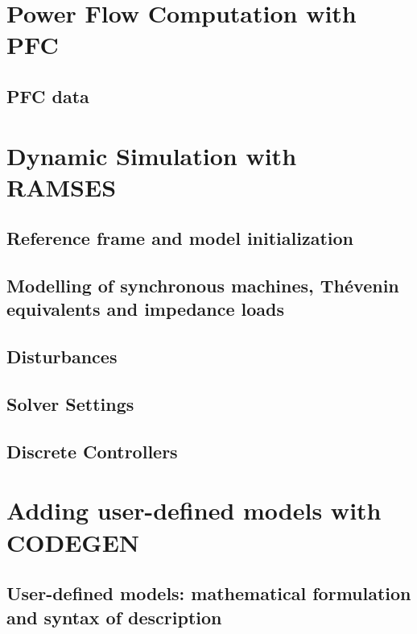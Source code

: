 \documentclass[11pt]{book}
\begin{document}
\part{Power Flow Computation with PFC}

\chapter{PFC data}\label{ch-pf}


\part{Dynamic Simulation with RAMSES}

\chapter{Reference frame and model initialization}


\chapter{Modelling of synchronous machines, Th\'{e}venin equivalents and impedance loads}


\chapter{Disturbances}


\chapter{Solver Settings}\label{ch-settings}


\chapter{Discrete Controllers}


\part{Adding user-defined models with CODEGEN}

\chapter{User-defined models: mathematical formulation and syntax of description}\label{ch-user_models}
\end{document}
